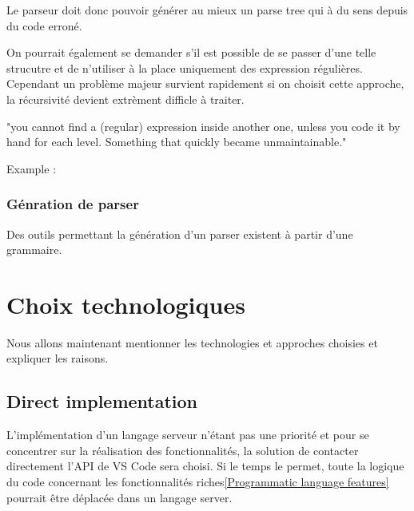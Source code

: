 \documentclass[
    iict, %
    il, %
]{heig-tb}
\begin{document}
Le parseur doit donc pouvoir générer au mieux un parse tree qui à du sens depuis du code erroné.

On pourrait également se demander s'il est possible de se passer d'une telle strucutre et de n'utiliser à la place uniquement des expression régulières.
Cependant un problème majeur survient rapidement si on choisit cette approche, la récursivité devient extrèment difficle à traiter.

"you cannot find a (regular) expression inside another one, unless you code it by hand for each level. Something that quickly became unmaintainable."

Example : %

\subsubsection{Génration de parser}
Des outils permettant la génération d'un parser existent à partir d'une grammaire.


\section{Choix technologiques}
Nous allons maintenant mentionner les technologies et approches choisies et expliquer les raisons.

\subsection{Direct implementation}
L'implémentation d'un langage serveur n'étant pas une priorité et pour se concentrer sur la réalisation des fonctionnalités, la solution de contacter directement l'API de VS Code sera choisi.
Si le temps le permet, toute la logique du code concernant les fonctionnalités riches\ref{Programmatic language features} pourrait être déplacée dans un langage server.

\end{document}
